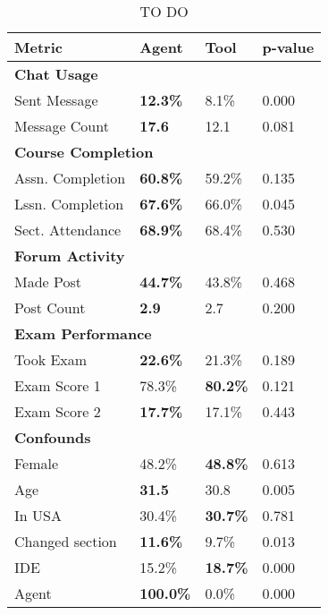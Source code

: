 \begin{table}[H]
\centering
\begin{tabularx}{\columnwidth}{l X X X}
\toprule
\textbf{Metric} & \textbf{Agent} & \textbf{Tool} & \textbf{p-value} \\
\midrule
\multicolumn{4}{l}{\textbf{Chat Usage}} \\
Sent Message & \textbf{12.3\%} & 8.1\% & 0.000 \\
Message Count & \textbf{17.6} & 12.1 & 0.081 \\
\midrule
\multicolumn{4}{l}{\textbf{Course Completion}} \\
Assn. Completion & \textbf{60.8\%} & 59.2\% & 0.135 \\
Lssn. Completion & \textbf{67.6\%} & 66.0\% & 0.045 \\
Sect. Attendance & \textbf{68.9\%} & 68.4\% & 0.530 \\
\midrule
\multicolumn{4}{l}{\textbf{Forum Activity}} \\
Made Post & \textbf{44.7\%} & 43.8\% & 0.468 \\
Post Count & \textbf{2.9} & 2.7 & 0.200 \\
\midrule
\multicolumn{4}{l}{\textbf{Exam Performance}} \\
Took Exam & \textbf{22.6\%} & 21.3\% & 0.189 \\
Exam Score 1 & 78.3\% & \textbf{80.2\%} & 0.121 \\
Exam Score 2 & \textbf{17.7\%} & 17.1\% & 0.443 \\
\midrule
\multicolumn{4}{l}{\textbf{Confounds}} \\
Female & 48.2\% & \textbf{48.8\%} & 0.613 \\
Age & \textbf{31.5} & 30.8 & 0.005 \\
In USA & 30.4\% & \textbf{30.7\%} & 0.781 \\
Changed section & \textbf{11.6\%} & 9.7\% & 0.013 \\
IDE & 15.2\% & \textbf{18.7\%} & 0.000 \\
Agent & \textbf{100.0\%} & 0.0\% & 0.000 \\
\bottomrule
\end{tabularx}
\caption{TO DO}
\label{tab:to-do}
\end{table}